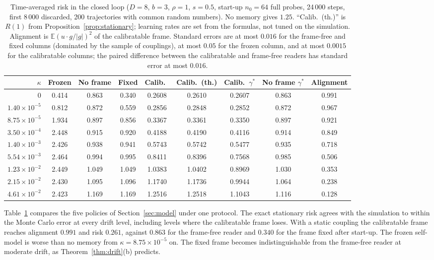 \documentclass[12pt]{article}
\theoremstyle{definition}
\newcommand{\E}{\mathbb E}
\begin{document}
\begin{table}[t]
\centering
\small
\setlength{\tabcolsep}{3.5pt}
\begin{tabular}{rcccccccc}
\toprule
$\kappa$ & Frozen & No frame & Fixed & Calib.\ & Calib.\ (th.) & Calib.\ $\gamma^*$ & No frame $\gamma^*$ & Alignment \\
\midrule
0 & 0.414 & 0.863 & 0.340 & 0.2608 & 0.2610 & 0.2607 & 0.863 & 0.991\\
$1.40\times10^{-5}$ & 0.812 & 0.872 & 0.559 & 0.2856 & 0.2848 & 0.2852 & 0.872 & 0.967\\
$8.75\times10^{-5}$ & 1.934 & 0.897 & 0.856 & 0.3367 & 0.3361 & 0.3350 & 0.897 & 0.921\\
$3.50\times10^{-4}$ & 2.448 & 0.915 & 0.920 & 0.4188 & 0.4190 & 0.4116 & 0.914 & 0.849\\
$1.40\times10^{-3}$ & 2.426 & 0.938 & 0.941 & 0.5743 & 0.5742 & 0.5477 & 0.935 & 0.718\\
$5.54\times10^{-3}$ & 2.464 & 0.994 & 0.995 & 0.8411 & 0.8396 & 0.7568 & 0.985 & 0.506\\
$1.23\times10^{-2}$ & 2.449 & 1.049 & 1.049 & 1.0383 & 1.0402 & 0.8969 & 1.030 & 0.353\\
$2.15\times10^{-2}$ & 2.430 & 1.095 & 1.096 & 1.1740 & 1.1736 & 0.9944 & 1.064 & 0.238\\
$4.61\times10^{-2}$ & 2.423 & 1.169 & 1.169 & 1.2516 & 1.2518 & 1.1043 & 1.116 & 0.128\\
\bottomrule
\end{tabular}
\caption{Time-averaged risk in the closed loop ($D=8$, $b=3$, $\rho=1$, $s=0.5$, start-up $n_0=64$ full probes, 24\,000 steps, first 8\,000 discarded, 200 trajectories with common random numbers). No memory gives $1.25$. ``Calib.\ (th.)'' is $R(1)$ from Proposition~\ref{prop:stationary}; learning rates are set from the formulas, not tuned on the simulation. Alignment is $\E(u\cdot g/|g|)^2$ of the calibratable frame. Standard errors are at most $0.016$ for the frame-free and fixed columns (dominated by the sample of couplings), at most $0.05$ for the frozen column, and at most $0.0015$ for the calibratable columns; the paired difference between the calibratable and frame-free readers has standard error at most $0.016$.}
\label{tab:loop}
\end{table}

Table~\ref{tab:loop} compares the five policies of Section~\ref{sec:model} under one protocol. The exact stationary risk agrees with the simulation to within the Monte Carlo error at every drift level, including levels where the calibratable frame loses. With a static coupling the calibratable frame reaches alignment $0.991$ and risk $0.261$, against $0.863$ for the frame-free reader and $0.340$ for the frame fixed after start-up. The frozen self-model is worse than no memory from $\kappa=8.75\times10^{-5}$ on. The fixed frame becomes indistinguishable from the frame-free reader at moderate drift, as Theorem~\ref{thm:drift}(b) predicts.
\end{document}
